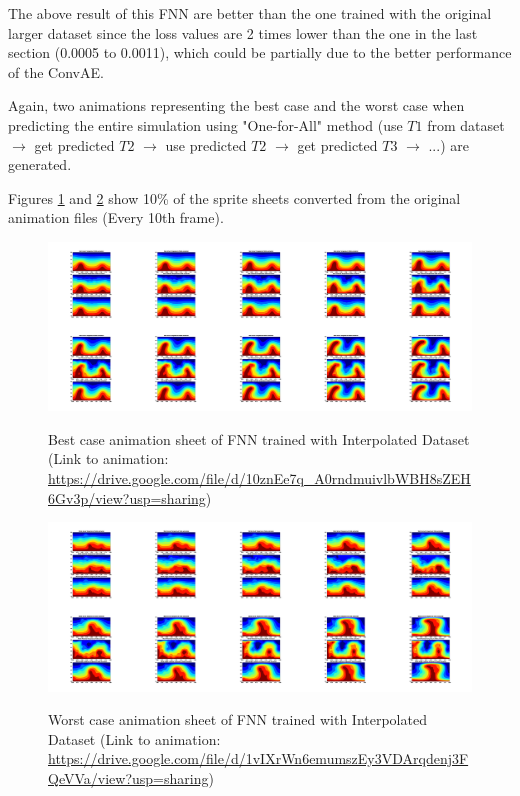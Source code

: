 The above result of this FNN are better than the one trained with the original larger dataset since the loss values are 2 times lower than the one in the last section (0.0005 to 0.0011), which could be partially due to the better performance of the ConvAE.

Again, two animations representing the best case and the worst case when predicting the entire simulation using "One-for-All" method (use $T1$ from dataset $\rightarrow$ get predicted $T2$ $\rightarrow$ use predicted $T2$ $\rightarrow$ get predicted $T3$ $\rightarrow$ ...) are generated.

Figures \ref{figure:FNN_interpolated_best_gif} and \ref{figure:FNN_interpolated_worst_gif} show 10\% of the sprite sheets converted from the original animation files (Every 10th frame).

\begin{figure}[H]
    \centering
    \caption{Best case animation sheet of FNN trained with Interpolated Dataset (Link to animation: \url{https://drive.google.com/file/d/10znEe7q_A0rndmuivlbWBH8sZEH6Gv3p/view?usp=sharing})}
    \includegraphics[scale=0.10]{figures/mantle_convection_images/larger_dataset_interpolated/FNN_Best_GIF_sheet.png}
    \label{figure:FNN_interpolated_best_gif}
\end{figure}

\begin{figure}[H]
    \centering
    \caption{Worst case animation sheet of FNN trained with Interpolated Dataset (Link to animation: 
    \url{https://drive.google.com/file/d/1vIXrWn6emumszEy3VDArqdenj3FQeVVa/view?usp=sharing})}
    \includegraphics[scale=0.10]{figures/mantle_convection_images/larger_dataset_interpolated/FNN_Worst_GIF_sheet.png}
    \label{figure:FNN_interpolated_worst_gif}
\end{figure}

